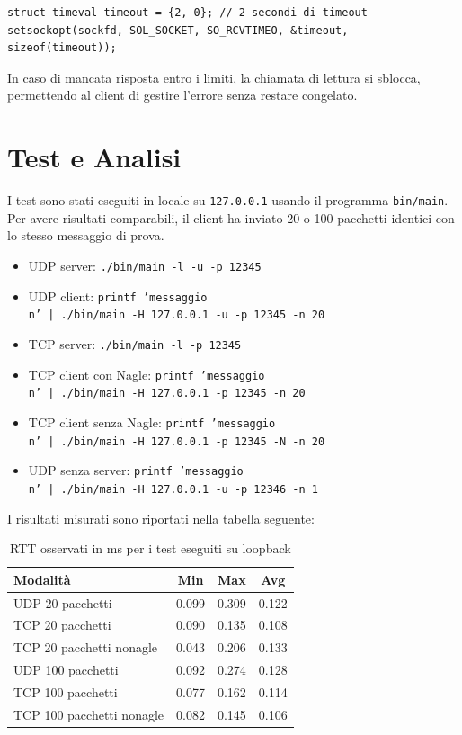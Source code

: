 \documentclass[12pt,a4paper,oneside]{article}
\begin{document}
\begin{lstlisting}[style=CStyle, caption={Configurazione del timeout di ricezione sul socket}]
struct timeval timeout = {2, 0}; // 2 secondi di timeout
setsockopt(sockfd, SOL_SOCKET, SO_RCVTIMEO, &timeout, sizeof(timeout));
\end{lstlisting}
In caso di mancata risposta entro i limiti, la chiamata di lettura si sblocca, permettendo al client di gestire l'errore senza restare congelato.

\section{Test e Analisi}
I test sono stati eseguiti in locale su \texttt{127.0.0.1} usando il programma \texttt{bin/main}. Per avere risultati comparabili, il client ha inviato 20 o 100 pacchetti identici con lo stesso messaggio di prova.

\begin{itemize}
    \item UDP server: \texttt{./bin/main -l -u -p 12345}
    \item UDP client: \texttt{printf 'messaggio\\n' | ./bin/main -H 127.0.0.1 -u -p 12345 -n 20}
    \item TCP server: \texttt{./bin/main -l -p 12345}
    \item TCP client con Nagle: \texttt{printf 'messaggio\\n' | ./bin/main -H 127.0.0.1 -p 12345 -n 20}
    \item TCP client senza Nagle: \texttt{printf 'messaggio\\n' | ./bin/main -H 127.0.0.1 -p 12345 -N -n 20}
    \item UDP senza server: \texttt{printf 'messaggio\\n' | ./bin/main -H 127.0.0.1 -u -p 12346 -n 1}
\end{itemize}


I risultati misurati sono riportati nella tabella seguente:
\begin{table}[H]
\centering
\caption{RTT osservati in ms per i test eseguiti su loopback}
\begin{tabular}{@{}lccc@{}}
\toprule
\textbf{Modalità} & \textbf{Min} & \textbf{Max} & \textbf{Avg} \\ \midrule
UDP 20 pacchetti & 0.099 & 0.309 & 0.122 \\
TCP 20 pacchetti & 0.090 & 0.135 & 0.108 \\
TCP 20 pacchetti nonagle & 0.043 & 0.206 & 0.133 \\
UDP 100 pacchetti & 0.092 & 0.274 & 0.128 \\
TCP 100 pacchetti & 0.077 & 0.162 & 0.114 \\
TCP 100 pacchetti nonagle & 0.082 & 0.145 & 0.106 \\\bottomrule
\end{tabular}
\end{table}
\end{document}
